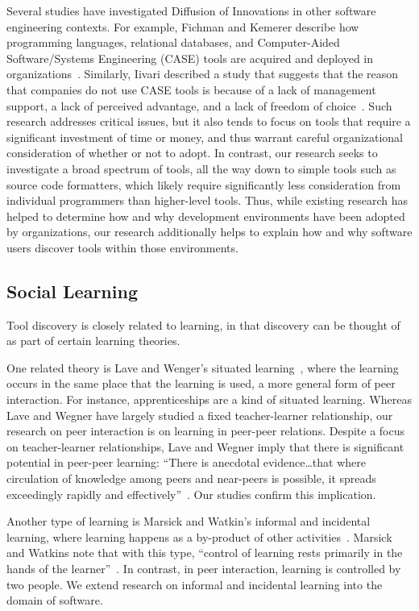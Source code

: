 \documentclass[smallextended]{svjour3}
\newcommand\discovery{peer interaction\xspace}
\begin{document}
Several studies have investigated Diffusion of Innovations in
other software engineering contexts.
For example, Fichman and Kemerer describe how programming
languages, relational databases, and Computer-Aided Software/Systems Engineering (CASE) tools are
acquired and deployed in organizations~\cite{fichman99}. 
Similarly, Iivari described a study that suggests that the reason that
companies do not use CASE tools is because of a lack of management support, a 
lack of perceived advantage, and a lack of freedom of choice~\cite{iivari}.
Such research addresses critical issues, but it also
tends to focus on tools that require a significant investment of time 
or money, and thus warrant careful organizational consideration of whether or
not to adopt. 
In contrast, our research seeks to investigate a broad spectrum of tools, all
the way down to simple tools such as source code formatters, which likely require
significantly less consideration from individual programmers than higher-level
tools. 
Thus, while existing research has helped to determine
how and why development environments have been adopted by organizations, our
research additionally helps to explain how and why software users discover tools within
those environments.

\subsection{Social Learning}

\noindent
Tool discovery is closely related to learning, in that discovery can be thought 
of as part of certain learning theories.

One related theory is Lave and Wenger's situated learning~\cite{lave}, where the learning
occurs in the same place that the learning is used, a more general form of
\discovery.
For instance, apprenticeships are a kind of situated learning. 
Whereas Lave and Wegner have largely studied a fixed teacher-learner
relationship, our research on \discovery is on learning in peer-peer relations. 
Despite a focus on teacher-learner relationships, Lave and Wegner imply that
there is significant potential in peer-peer learning: ``There is anecdotal
evidence\ldots that where circulation of knowledge among peers and near-peers
is possible, it spreads exceedingly rapidly and effectively''~\cite{lave}.
Our studies confirm this implication.

Another type of learning is Marsick and Watkin's informal and incidental
learning, where learning happens as a by-product of other
activities~\cite{marsick01}. 
Marsick and Watkins note that with this type, ``control of learning
rests primarily in the hands of the learner''~\cite{marsick01}.
In contrast, in \discovery, learning is controlled by two people. 
We extend research on informal and incidental learning 
into the domain of software.
\end{document}
